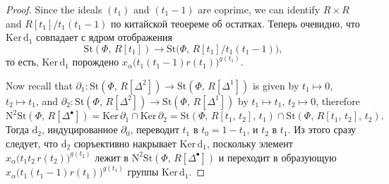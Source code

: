 \documentclass[12pt,a4paper]{article}
\begin{document}
\begin{lemma}
\begin{proof}
Since the ideals $(t_1)$ and $(t_1-1)$ are coprime, we can identify $R\times R$ and $R[t_1]/t_1(t_1-1)$ по китайской теоереме об остатках. Теперь очевидно, что $\mathrm{Ker}\,\mathrm d_1$ совпадает с ядром отображения
$$
\mathrm{St}(\Phi,\,R[t_1])\rightarrow\mathrm{St}\big(\Phi,\,R[t_1]/t_1(t_1-1)\big),
$$
то есть, $\mathrm{Ker}\,\mathrm d_1$ порождено $x_{\alpha}\big(t_1(t_1-1)r(t_1)\big)^{g(t_1)}$.

Now recall that $\partial_1\colon\mathrm{St}(\Phi,\,R[\Delta^2])\rightarrow\mathrm{St}(\Phi,\,R[\Delta^1])$ is given by $t_1\mapsto0$, $t_2\mapsto t_1$, and $\partial_2\colon\mathrm{St}(\Phi,\,R[\Delta^2])\rightarrow\mathrm{St}(\Phi,\,R[\Delta^1])$ by $t_1\mapsto t_1$, $t_2\mapsto0$, therefore
$$
\mathrm N^2\mathrm{St}(\Phi,\,R[\Delta^\bullet])=\mathrm{Ker}\,\partial_1\cap\mathrm{Ker}\,\partial_2=\mathrm{St}(\Phi,\,R[t_1,\,t_2],\,t_1)\cap\mathrm{St}(\Phi,\,R[t_1,\,t_2],\,t_2).
$$
Тогда $\mathrm d_2$, индуцированное $\partial_0$, переводит $t_1$ в $t_0=1-t_1$, и $t_2$ в $t_1$. Из этого сразу следует, что $\mathrm d_2$ сюръективно накрывает $\mathrm{Ker}\,\mathrm d_1$, поскольку элемент $x_{\alpha}\big(t_1t_2\,r(t_2)\big)^{g(t_2)}$ лежит в $\mathrm N^2\mathrm{St}(\Phi,\,R[\Delta^\bullet])$ и переходит в образующую $x_{\alpha}\big(t_1(t_1-1)r(t_1)\big)^{g(t_1)}$ группы $\mathrm{Ker}\,\mathrm d_1$.
\end{proof}
\end{lemma}
\end{document}
